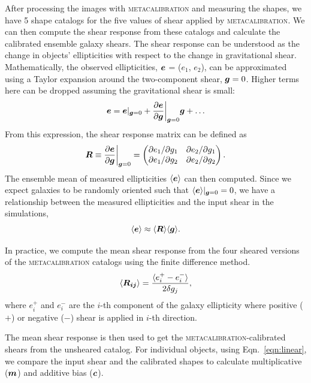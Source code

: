 \documentclass[fleqn,usenatbib]{mnras}
\begin{document}
After processing the images with \textsc{metacalibration} and measuring the shapes, we have 5 shape catalogs for the five values of shear applied by \textsc{metacalibration}. We can then compute the shear response from these catalogs and calculate the calibrated ensemble galaxy shears. The shear response can be understood as the change in objects' ellipticities with respect to the change in gravitational shear. Mathematically, the observed ellipticities, $\vb*{e}$ = ($e_{1}$, $e_{2}$), can be approximated using a Taylor expansion around the two-component shear, $\vb*{g}=0$. Higher terms here can be dropped assuming the gravitational shear is small: 
\begin{equation}
    \vb*{e} = \vb*{e}\rvert_{\vb*{g}=0} + \frac{\partial \vb*{e}}{\partial \vb*{g}}\bigg\rvert_{\vb*{g}=0}\vb*{g} + \ldots
\end{equation}
From this expression, the shear response matrix can be defined as 
\begin{equation}
    \vb*{R} \equiv \frac{\partial \vb*{e}}{\partial \vb*{g}}\bigg\rvert_{\vb*{g}=0} = 
    \begin{pmatrix}
        \partial e_{1}/\partial g_{1} & \partial e_{2}/\partial g_{1} \\ 
        \partial e_{1}/\partial g_{2} & \partial e_{2}/\partial g_{2}
    \end{pmatrix}. 
\end{equation}
The ensemble mean of measured ellipticities $\langle\vb*{e}\rangle$ can then computed. Since we expect galaxies to be randomly oriented such that $\langle\vb*{e}\rangle\rvert_{\vb*{g}=0}=0$, we have a relationship between the measured ellipticities and the input shear in the simulations, 
\begin{equation}
    \langle\vb*{e}\rangle \approx \langle \vb*{R}\rangle\langle\vb*{g} \rangle. 
\end{equation} 


In practice, we compute the mean shear response from the four sheared versions of the \textsc{metacalibration} catalogs using the finite difference method. 
\begin{equation}
    \langle\vb*{R_{ij}}\rangle = 
    \frac{\langle e^{+}_{i} - e^{-}_{i} \rangle}{2\delta g_{j}}, 
\end{equation}
where $e^{+}_{i}$ and $e^{-}_{i}$ are the $i$-th component of the galaxy ellipticity where positive ($+$) or negative ($-$) shear is applied in $i$-th direction. 

The mean shear response is then used to get the \textsc{metacalibration}-calibrated shears from the unsheared catalog. For individual objects, using Eqn.~\eqref{eqn:linear}, we compare the input shear and the calibrated shapes to calculate multiplicative ($\vb*{m}$) and additive bias ($\vb*{c}$).
\end{document}
